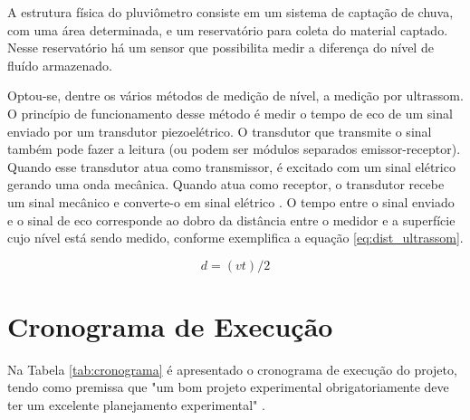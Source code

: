 \documentclass[12pt,a4paper]{instrumentacao}
\begin{document}
A estrutura física do pluviômetro consiste em um sistema de captação de chuva, com uma área determinada, e um reservatório para coleta do material captado. Nesse reservatório há um sensor que possibilita medir a diferença do nível de fluído armazenado.

Optou-se, dentre os vários métodos de medição de nível, a medição por ultrassom. O princípio de funcionamento desse método é medir o tempo de eco de um sinal enviado por um transdutor piezoelétrico. O transdutor que transmite o sinal também pode fazer a leitura (ou podem ser módulos separados emissor-receptor). Quando esse transdutor atua como transmissor, é excitado com um sinal elétrico gerando uma onda mecânica. Quando atua como receptor, o transdutor recebe um sinal mecânico e converte-o em sinal elétrico \cite{livro-texto}. O tempo entre o sinal enviado e o sinal de eco corresponde ao dobro da distância entre o medidor e a superfície cujo nível está sendo medido, conforme exemplifica a equação \ref{eq:dist_ultrassom}.

\begin{equation}
	d=(vt)/2
	\label{eq:dist_ultrassom}
\end{equation}



\chapter{Cronograma de Execução}

Na Tabela \ref{tab:cronograma} é apresentado o cronograma de execução do projeto, tendo como premissa que "um bom projeto experimental obrigatoriamente deve ter um excelente planejamento experimental" \cite{livro-texto}.
\end{document}
